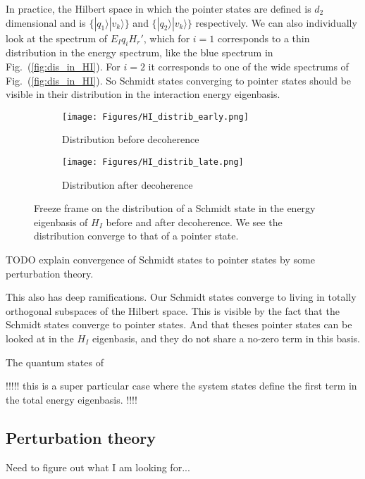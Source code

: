 \documentclass{article}
\begin{document}
In practice, the Hilbert space in which the pointer states are defined is $d_2$ dimensional and is $\{|q_1\rangle|v_k\rangle\}$ and $\{|q_2\rangle|v_k\rangle\}$ respectively. We can also individually look at the spectrum of $E_Iq_iH_r'$, which for $i=1$ corresponds to a thin distribution in the energy spectrum, like the blue spectrum in Fig.~(\ref{fig:dis_in_HI}). For $i=2$ it corresponds to one of the wide spectrums of Fig.~(\ref{fig:dis_in_HI}). So Schmidt states converging to pointer states should be visible in their distribution in the interaction energy eigenbasis.

\begin{figure}[h!]
  \centering
  \begin{subfigure}[b]{0.49\linewidth}
    \texttt{[image: Figures/HI\_distrib\_early.png]}
    \label{fig:1}
    \caption{Distribution before decoherence}
  \end{subfigure}
  \begin{subfigure}[b]{0.49\linewidth}
    \texttt{[image: Figures/HI\_distrib\_late.png]}
    \label{fig:2}
    \caption{Distribution after decoherence}
  \end{subfigure}
  \caption{}
  \label{fig:dist_EI_dep}
  \caption{Freeze frame on the distribution of a Schmidt state in the energy eigenbasis of $H_I$ before and after decoherence. We see the distribution converge to that of a pointer state.}
\end{figure}


TODO explain convergence of Schmidt states to pointer states by some perturbation theory. 

This also has deep ramifications. Our Schmidt states converge to living in totally orthogonal subspaces of the Hilbert space. This is visible by the fact that the Schmidt states converge to pointer states. And that theses pointer states can be looked at in the $H_I$ eigenbasis, and they do not share a no-zero term in this basis.

The quantum states of 

!!!!!
this is a super particular case where the system states define the first term in the total energy eigenbasis. 
!!!!

\subsection{Perturbation theory}

Need to figure out what I am looking for...
\end{document}
